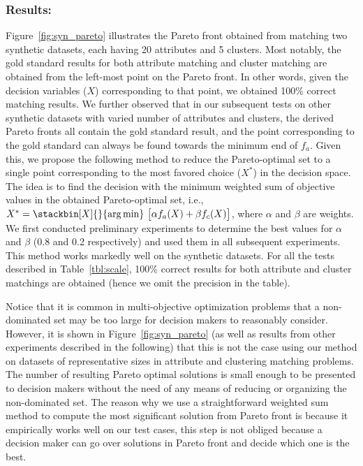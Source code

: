 \subsubsection{Results:}
Figure~\ref{fig:syn_pareto} illustrates the Pareto front obtained from matching two synthetic datasets, each having 20 attributes and 5 clusters. Most notably, the gold standard results for both attribute matching and cluster matching are obtained from the left-most point on the Pareto front. In other words, given the decision variables ($X$) corresponding to that point, we obtained 100\% correct matching results. We further observed that in our subsequent tests on other synthetic datasets with varied number of attributes and clusters, the derived Pareto fronts all contain the gold standard result, and the point corresponding to the gold standard can always be found towards the minimum end of $f_a$. Given this, we propose the following method to reduce the Pareto-optimal set to a single point corresponding to the most favored choice ($X^*$) in the decision space. The idea is to find the decision with the minimum weighted sum of objective values in the obtained Pareto-optimal set, i.e., $X^*=\stackbin[X]{}{\argmin}~\big[\alpha f_a(X)+\beta f_c(X)\big]$, where $\alpha$ and $\beta$ are weights. We first conducted preliminary experiments to determine the best values for $\alpha$ and $\beta$ (0.8 and 0.2 respectively) and used them in all subsequent experiments. This method works markedly well on the synthetic datasets. For all the tests described in Table~\ref{tbl:scale}, 100\% correct results for both attribute and cluster matchings are obtained (hence we omit the precision in the table).

Notice that it is common in multi-objective optimization problems that a non-dominated set may be too large for decision makers to reasonably consider. However, it is shown in Figure~\ref{fig:syn_pareto} (as well as results from other experiments described in the following) that this is not the case using our method on datasets of representative sizes in attribute and clustering matching problems. The number of resulting Pareto optimal solutions is small enough to be presented to decision makers without the need of any means of reducing or organizing the non-dominated set. The reason why we use a straightforward weighted sum method to compute the most significant solution from Pareto front is because it empirically works well on our test cases, this step is not obliged because a decision maker can go over solutions in Pareto front and decide which one is the best.


